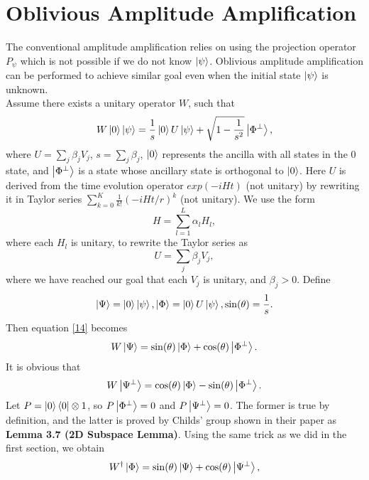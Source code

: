 \documentclass{article}
\begin{document}
\section{Oblivious Amplitude Amplification}
The conventional amplitude amplification relies on using the projection operator $P_\psi$ which is not possible if we do not know $\ket{\psi}$. Oblivious amplitude amplification can be performed to achieve similar goal even when the initial state $\ket{\psi}$ is unknown.\\
Assume there exists a unitary operator $W$, such that
\begin{equation}\label{14}
    W\ket{0}\ket{\psi} = \frac{1}{s}\ket{0}U\ket{\psi} + \sqrt{1 - \frac{1}{s^2}}\ket{\Phi ^\bot},
\end{equation}
where $U = \sum_j \beta_j V_j$, $s = \sum_j \beta_j$, $\ket{0}$ represents the ancilla with all states in the 0 state, and $\ket{\Phi ^\bot}$ is a state whose ancillary state is orthogonal to $\ket{0}$. Here $U$ is derived from the time evolution operator $exp(-iHt)$ (not unitary) by rewriting it in Taylor series $\sum_{k=0}^K \frac{1}{k!}(-iHt/r)^k$ (not unitary). We use the form 
\begin{equation}
    H = \sum_{l=1}^L \alpha_l H_l \nonumber,
\end{equation}
where each $H_l$ is unitary, to rewrite the Taylor series as
\begin{equation}
    U = \sum_j \beta_j V_j,
\end{equation}
where we have reached our goal that each $V_j$ is unitary, and $\beta_j > 0 $. Define
\begin{equation}
    \ket{\Psi} = \ket{0}\ket{\psi}, \ket{\Phi} = \ket{0}U\ket{\psi}, \sin(\theta) = \frac{1}{s}.
\end{equation}
Then equation \ref{14} becomes
\begin{equation}
    W\ket{\Psi} = \sin(\theta)\ket{\Phi} + \cos(\theta) \ket{\Phi ^\bot}.
\end{equation}
It is obvious that
\begin{equation}
    W\ket{\Psi ^\bot} = \cos(\theta)\ket{\Phi} - \sin(\theta) \ket{\Phi ^\bot}.
\end{equation}
Let $P = \ket{0}\bra{0} \otimes 1$, so $P \ket{\Phi ^\bot} = 0$ and $P \ket{\Psi ^\bot} = 0$. The former is true by definition, and the latter is proved by Childs' group shown in their paper as \textbf{Lemma 3.7 (2D Subspace Lemma)}. Using the same trick as we did in the first section, we obtain
\begin{equation}
    W^\dagger \ket{\Phi} = \sin(\theta)\ket{\Psi} + \cos(\theta) \ket{\Psi ^\bot},
\end{equation}
\end{document}
